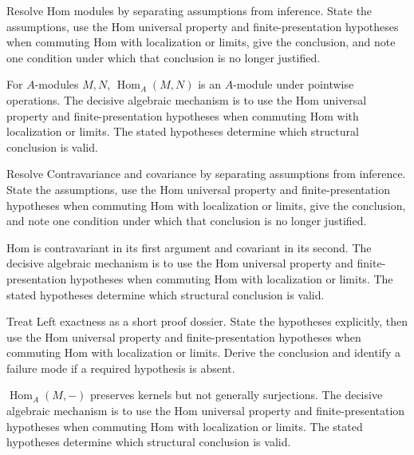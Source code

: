 \begin{problem}\label{prob:v12-problem-01}
Resolve Hom modules by separating assumptions from inference. State the assumptions, use the Hom universal property and finite-presentation hypotheses when commuting Hom with localization or limits, give the conclusion, and note one condition under which that conclusion is no longer justified.
\end{problem}
\begin{solution}
For $A$-modules $M,N$, $\operatorname{Hom}_A(M,N)$ is an $A$-module under pointwise operations. The decisive algebraic mechanism is to use the Hom universal property and finite-presentation hypotheses when commuting Hom with localization or limits. The stated hypotheses determine which structural conclusion is valid.
\end{solution}

\begin{problem}\label{prob:v12-problem-02}
Resolve Contravariance and covariance by separating assumptions from inference. State the assumptions, use the Hom universal property and finite-presentation hypotheses when commuting Hom with localization or limits, give the conclusion, and note one condition under which that conclusion is no longer justified.
\end{problem}
\begin{solution}
Hom is contravariant in its first argument and covariant in its second. The decisive algebraic mechanism is to use the Hom universal property and finite-presentation hypotheses when commuting Hom with localization or limits. The stated hypotheses determine which structural conclusion is valid.
\end{solution}

\begin{problem}\label{prob:v12-problem-03}
Treat Left exactness as a short proof dossier. State the hypotheses explicitly, then use the Hom universal property and finite-presentation hypotheses when commuting Hom with localization or limits. Derive the conclusion and identify a failure mode if a required hypothesis is absent.
\end{problem}
\begin{solution}
$\operatorname{Hom}_A(M,-)$ preserves kernels but not generally surjections. The decisive algebraic mechanism is to use the Hom universal property and finite-presentation hypotheses when commuting Hom with localization or limits. The stated hypotheses determine which structural conclusion is valid.
\end{solution}

